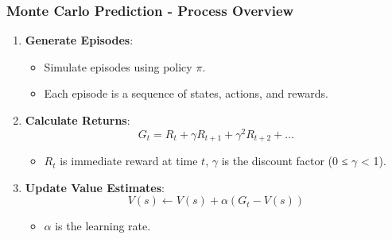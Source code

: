 \documentclass[aspectratio=169]{beamer}
\begin{document}
\begin{frame}[fragile]
    \frametitle{Monte Carlo Prediction - Process Overview}
    \begin{enumerate}
        \item \textbf{Generate Episodes}:
        \begin{itemize}
            \item Simulate episodes using policy \(\pi\).
            \item Each episode is a sequence of states, actions, and rewards.
        \end{itemize}
        
        \item \textbf{Calculate Returns}:
        \begin{equation}
            G_t = R_t + \gamma R_{t+1} + \gamma^2 R_{t+2} + \ldots
        \end{equation}
        \begin{itemize}
            \item \(R_t\) is immediate reward at time \(t\), \(\gamma\) is the discount factor (0 ≤ \(\gamma\) < 1).
        \end{itemize}
        
        \item \textbf{Update Value Estimates}:
        \begin{equation}
            V(s) \leftarrow V(s) + \alpha (G_t - V(s))
        \end{equation}
        \begin{itemize}
            \item \(\alpha\) is the learning rate.
        \end{itemize}
    \end{enumerate}
\end{frame}
\end{document}
